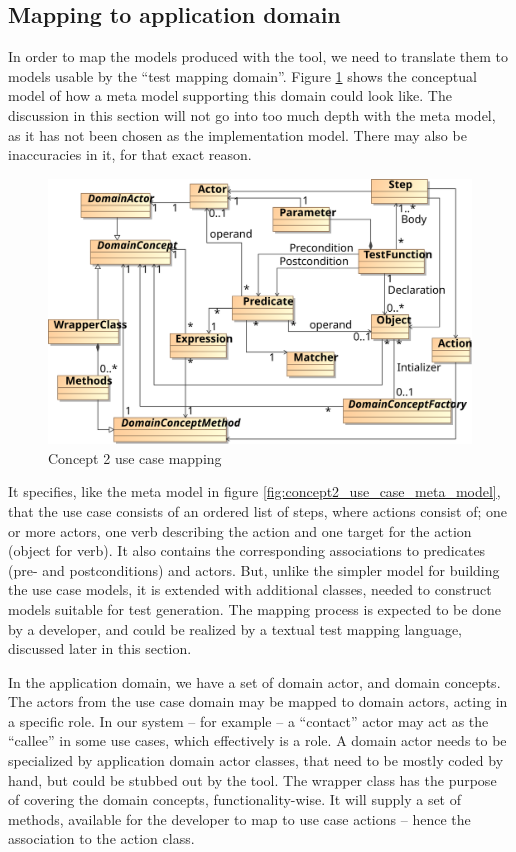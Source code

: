 \subsection{Mapping to application domain}
In order to map the models produced with the tool, we need to translate them to models usable by the ``test mapping domain''. Figure \ref{fig:concept2_use_case_mapping} shows the conceptual model of how a meta model supporting this domain could look like. The discussion in this section will not go into too much depth with the meta model, as it has not been chosen as the implementation model. There may also be inaccuracies in it, for that exact reason.
\begin{figure}[!htbp]
  \centering
  \includegraphics[scale=0.72]{img/concept2_use_case_mapping}
  \caption{Concept 2 use case mapping}
  \label{fig:concept2_use_case_mapping}
\end{figure}It specifies, like the meta model in figure \ref{fig:concept2_use_case_meta_model}, that the use case consists of an ordered list of steps, where actions consist of; one or more actors, one verb describing the action and one target for the action (object for verb). It also contains the corresponding associations to predicates (pre- and postconditions) and actors. But, unlike the simpler model for building the use case models, it is extended with additional classes, needed to construct models suitable for test generation. The mapping process is expected to be done by a developer, and could be realized by a textual test mapping language, discussed later in this section.\medskip

\noindent In the application domain, we have a set of domain actor, and domain concepts. The actors from the use case domain may be mapped to domain actors, acting in a specific role. In our system -- for example -- a ``contact'' actor may act as the ``callee'' in some use cases, which effectively is a role. A domain actor needs to be specialized by application domain actor classes, that need to be mostly coded by hand, but could be stubbed out by the tool. The wrapper class has the purpose of covering the domain concepts, functionality-wise. It will supply a set of methods, available for the developer to map to use case actions -- hence the association to the action class.\medskip


